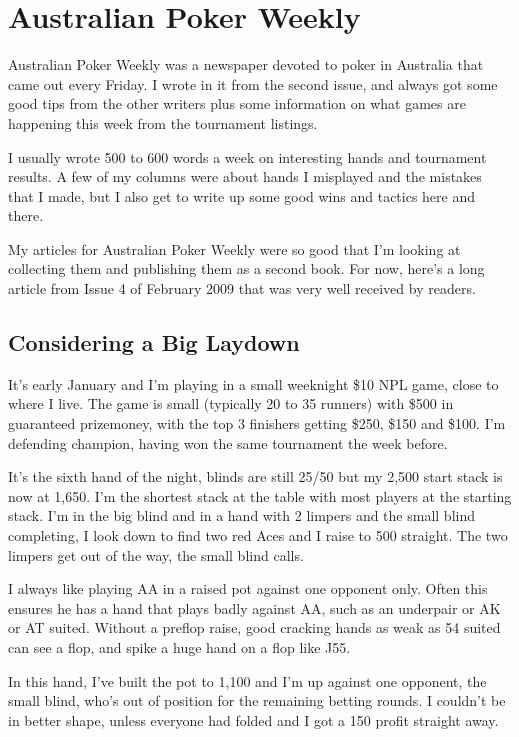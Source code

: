 \chapter{Australian Poker Weekly}


Australian Poker Weekly was a newspaper devoted to poker in Australia
that came out every Friday. I wrote in it from the second issue,
and always got some good tips from the other writers plus some information 
on what games are happening this week from the tournament listings. 

I usually wrote 500 to 600 words a week on interesting hands and 
tournament results. A few of my columns were about hands I misplayed 
and the mistakes that I made, but I also get to write up some good 
wins and tactics here and there. 

My articles for Australian Poker Weekly were so good that I'm 
looking at collecting them and publishing them as a second book.
For now, here's a long article from Issue 4 of February 2009
that was very well received by readers.

\section{Considering a Big Laydown}

It's early January and I'm playing in a small weeknight \$10 NPL game, 
close to where I live. The game is small (typically 20 to 35 runners) with 
\$500 in guaranteed prizemoney, with the top 3 finishers getting \$250, \$150 
and \$100. I'm defending champion, having won the same tournament 
the week before.

It's the sixth hand of the night, blinds are still 25/50 but 
my 2,500 start stack is now at 1,650. I'm the shortest stack at the 
table with most players at the starting stack. I'm in the big blind and 
in a hand with 2 limpers and the small blind completing, I look down to 
find two red Aces and I raise to 500 straight. The two limpers get out 
of the way, the small blind calls.

I always like playing AA in a raised pot against one opponent only. 
Often this ensures he has a hand that plays badly against AA, such as 
an underpair or AK or AT suited. Without a preflop raise, good 
cracking hands as weak as 54 suited can see a flop, and spike a huge 
hand on a flop like J55.

In this hand, I've built the pot to 1,100 and I'm up against one 
opponent, the small blind, who's out of position for the remaining 
betting rounds. I couldn't be in better shape, unless everyone had 
folded and I got a 150 profit straight away.

